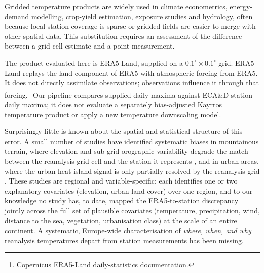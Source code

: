 \documentclass[a4paper,12pt,leqno]{article}
\begin{document}
Gridded temperature products are widely used in climate econometrics,
energy-demand modelling, crop-yield estimation, exposure studies and
hydrology, often because local station coverage is sparse or gridded
fields are easier to merge with other spatial data. This substitution
requires an assessment of the difference between a grid-cell estimate
and a point measurement.

The product evaluated here is ERA5-Land, supplied on a
$0.1^\circ\times0.1^\circ$ grid. ERA5-Land replays the land component of
ERA5 with atmospheric forcing from ERA5. It does not directly assimilate
observations; observations influence it through that forcing.\footnote{\href{https://cds.climate.copernicus.eu/datasets/derived-era5-land-daily-statistics?tab=overview}{Copernicus ERA5-Land daily-statistics documentation}.}
Our pipeline compares supplied daily maxima against ECA\&D station
daily maxima; it does not evaluate a separately bias-adjusted Kayrros
temperature product or apply a new temperature downscaling model.

Surprisingly little is known about the spatial and statistical structure
of this error. A small number of studies have identified systematic
biases in mountainous terrain, where elevation and sub-grid orographic
variability degrade the match between the reanalysis grid cell and the
station it represents
\parencite{satyapragyan2026bias,sebbar2023ml_downscaling,jacobs2024filling,nogueira2022assessment,zou2022performance},
and in urban areas, where the urban heat island signal is only partially
resolved by the reanalysis grid
\parencite{jacobs2024filling,nogueira2022assessment,zou2022performance}.
These studies are regional and variable-specific: each identifies one or
two explanatory covariates (elevation, urban land cover) over one region,
and to our knowledge no study has, to date, mapped the ERA5-to-station
discrepancy jointly across the full set of plausible covariates
(temperature, precipitation, wind, distance to the sea, vegetation,
urbanisation class) at the scale of an entire continent. A systematic,
Europe-wide characterisation of \emph{where, when, and why} reanalysis
temperatures depart from station measurements has been missing.
\end{document}
